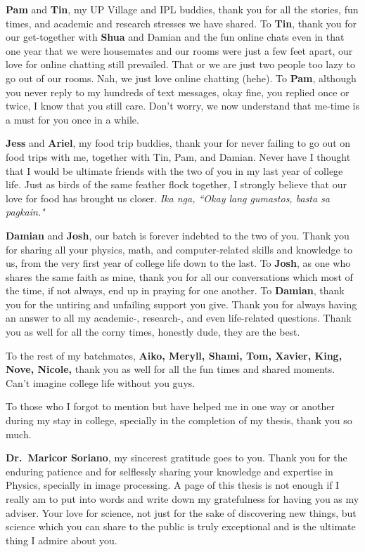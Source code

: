 \textbf{Pam} and \textbf{Tin}, my UP Village and IPL buddies, thank you for all the stories, fun times, and academic and research stresses we have shared. To \textbf{Tin}, thank you for our get-together with \textbf{Shua} and Damian and the fun online chats even in that one year that we were housemates and our rooms were just a few feet apart, our love for online chatting still prevailed. That or we are just two people too lazy to go out of our rooms. Nah, we just love online chatting (hehe). To \textbf{Pam}, although you never reply to my hundreds of text messages, okay fine, you replied once or twice, I know that you still care. Don't worry, we now understand that me-time is a must for you once in a while.

\textbf{Jess} and \textbf{Ariel}, my food trip buddies, thank your for never failing to go out on food trips with me, together with Tin, Pam, and Damian. Never have I thought that I would be ultimate friends with the two of you in my last year of college life. Just as birds of the same feather flock together, I strongly believe that our love for food has brought us closer. \textit{Ika nga, ``Okay lang gumastos, basta sa pagkain."}

\textbf{Damian} and \textbf{Josh}, our batch is forever indebted to the two of you. Thank you for sharing all your physics, math, and computer-related skills and knowledge to us, from the very first year of college life down to the last. To \textbf{Josh}, as one who shares the same faith as mine, thank you for all our conversations which most of the time, if not always, end up in praying for one another. To \textbf{Damian}, thank you for the untiring and unfailing support you give. Thank you for always having an answer to all my academic-, research-, and even life-related questions. Thank you as well for all the corny times, honestly dude, they are the best.

To the rest of my batchmates, \textbf{Aiko, Meryll, Shami, Tom, Xavier, King, Nove, Nicole,} thank you as well for all the fun times and shared moments. Can't imagine college life without you guys. 

To those who I forgot to mention but have helped me in one way or another during my stay in college, specially in the completion of my thesis, thank you so much.

\textbf{Dr.\ Maricor Soriano}, my sincerest gratitude goes to you. Thank you for the enduring patience and for selflessly sharing your knowledge and expertise in Physics, specially in image processing. A page of this thesis is not enough if I really am to put into words and write down my gratefulness for having you as my adviser. Your love for science, not just for the sake of discovering new things, but science which you can share to the public is truly exceptional and is the ultimate thing I admire about you. 

